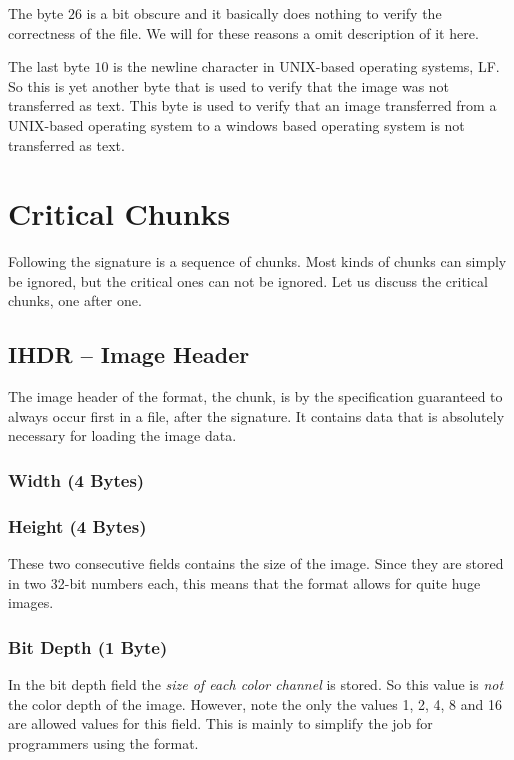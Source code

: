 The byte $26$ is a bit obscure and it basically does nothing to verify
the correctness of the file. We will for these reasons a omit
description of it here.

The last byte $10$ is the newline character in UNIX-based operating
systems, LF. So this is yet another byte that is used to verify that
the image was not transferred as text. This byte is used to verify
that an image transferred from a UNIX-based operating system to a
windows based operating system is not transferred as \ascii text.

\section{Critical Chunks}

Following the \png signature is a sequence of chunks. Most kinds of
chunks can simply be ignored, but the critical ones can not be
ignored. Let us discuss the critical chunks, one after one.

\subsection{IHDR -- Image Header}

The image header of the \png format, the  chunk, is by the
\png specification guaranteed to always occur first in a \png file,
after the \png signature. It contains data that is absolutely necessary
for loading the image data.

\subsubsection*{Width (4 Bytes)}
\subsubsection*{Height (4 Bytes)}

These two consecutive fields contains the size of the image. Since
they are stored in two 32-bit numbers each, this means that the \png
format allows for quite huge images.

\subsubsection*{Bit Depth (1 Byte)}

In the bit depth field the \textit{size of each color channel} is
stored. So this value is \textit{not} the color depth of the
image. However, note the only the values 1, 2, 4, 8 and 16 are allowed
values for this field. This is mainly to simplify the job for
programmers using the \png format.

